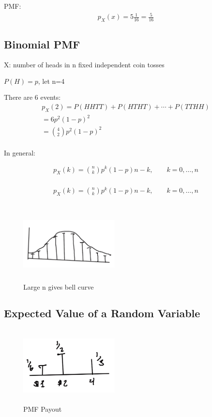 \documentclass{article}
\begin{document}
PMF: 
\begin{align*}
p_X(x)=5\frac{1}{16}=\frac{5}{16}
\end{align*}

\subsection{Binomial PMF}


X: number of heads in n fixed independent coin tosses

$P(H)=p$, let n=4

There are 6 events:
\begin{align*}
p_X(2)=P(HHTT) + P(HTHT) + \cdots + P(TTHH)\\
=6p^2(1-p)^2 \\
={4 \choose 2} p^2(1-p)^2 \\
\end{align*}

In general:

\begin{align*}
p_X(k)={n \choose k} p^k(1-p)n-k, \qquad k=0,\ldots,n\\
\end{align*}

\begin{align*}
p_X(k)=\binom{n}{k} p^k(1-p)n-k, \qquad k=0,\ldots,n\\
\end{align*}


\begin{figure}[h]
\centering
\includegraphics[width=5cm, height=4cm]{images/L05/bern_norm_approx.jpeg}
\caption{Large n gives bell curve}
\end{figure}

\subsection{Expected Value of a Random Variable}


\begin{figure}[h]
\centering
\includegraphics[width=5cm, height=4cm]{images/L05/EX_rv.jpeg}
\caption{PMF Payout}
\end{figure}
\end{document}

